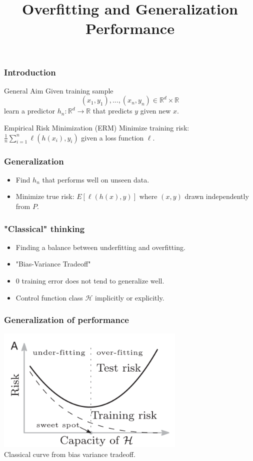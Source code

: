 \documentclass{beamer}
\title[Introductory Talk] %
{Overfitting and Generalization Performance}
\begin{document}
	
\frame{\titlepage}
	
\begin{frame}
\frametitle{Introduction}
	
	\begin{block}{General Aim}
		Given training sample \[(x_1, y_1), ..., (x_n, y_n) \in \mathbb{R}^d \times \mathbb{R}\]
		learn a predictor 
		$h_n : \mathbb{R}^d \to \mathbb{R}$ that predicts $y$ given new $x$.
	\end{block}
	
	\begin{block}{Empirical Risk Minimization (ERM)}
		Minimize training risk:
		$\frac{1}{n} \sum_{i=1}^{n}\ell(h(x_i), y_i) $
		given a loss function $\ell$.
	\end{block}

\end{frame}

\begin{frame}
\frametitle{Generalization}

\begin{itemize}[itemsep = 12pt]
	\item Find $h_n$ that performs well on unseen data.
	\item Minimize true risk: $E[\ell (h(x), y)]$
where  $(x, y)$ drawn independently from $P$.
\end{itemize}

\end{frame}

\begin{frame}
\frametitle{"Classical" thinking}
\begin{itemize}[itemsep = 12pt]
	\item Finding a balance between underfitting and overfitting.
	\item "Bias-Variance Tradeoff"
	\item 0 training error does not tend to generalize well.
	\item Control function class $\mathcal{H}$ implicitly or explicitly.
\end{itemize}
\end{frame}


\begin{frame}
\frametitle{Generalization of performance}
\includegraphics[height=6cm]{UCurve.png}
\\Classical curve from bias variance tradeoff.
\end{frame}
\end{document}
